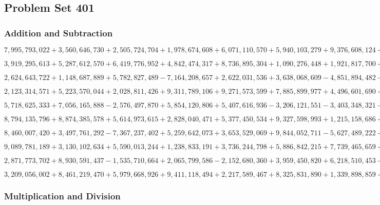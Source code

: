 \hypertarget{problem-set-401}{%
\subsection{Problem Set 401}\label{problem-set-401}}

\hypertarget{addition-and-subtraction}{%
\subsubsection{Addition and
Subtraction}\label{addition-and-subtraction}}

\(7,995,793,022+3,560,646,730+2,505,724,704+1,978,674,608+6,071,110,570+5,940,103,279+9,376,608,124+3,920,818,532+4,724,904,102+1,496,006,232\)

\(3,919,295,613+5,287,612,570+6,419,776,952+4,842,474,317+8,736,895,304+1,090,276,448+1,921,817,700+3,761,078,353+5,026,277,170+3,654,582,004\)

\(2,624,643,722+1,148,687,889+5,782,827,489-7,164,208,657+2,622,031,536+3,638,068,609-4,851,894,482-1,902,033,138+8,033,821,886-7,920,829,272\)

\(2,123,314,571+5,223,570,044+2,028,811,426+9,311,789,106+9,271,573,599+7,885,899,977+4,496,601,690+6,193,841,386+3,490,602,304+9,475,836,045\)

\(5,718,625,333+7,056,165,888-2,576,497,870+5,854,120,806+5,407,616,936-3,206,121,551-3,403,348,321-5,830,244,791+1,591,241,098+8,149,912,383\)

\(8,794,135,796+8,874,385,578+5,614,973,615+2,828,040,471+5,377,450,534+9,327,598,993+1,215,158,686+8,800,128,759+4,950,830,268+6,681,369,923\)

\(8,460,007,420+3,497,761,292-7,367,237,402+5,259,642,073+3,653,529,069+9,844,052,711-5,627,489,222+8,143,346,406-1,672,765,194-2,891,467,431\)

\(9,089,781,189+3,130,102,634+5,590,013,244+1,238,833,191+3,736,244,798+5,886,842,215+7,739,465,659+9,381,265,627+7,292,630,557+7,248,282,232\)

\(2,871,773,702+8,930,591,437-1,535,710,664+2,065,799,586-2,152,680,360+3,959,450,820+6,218,510,453-8,752,101,195+6,987,099,009-1,621,429,459\)

\(3,209,056,002+8,461,219,470+5,979,668,926+9,411,118,494+2,217,589,467+8,325,831,890+1,339,898,859+1,856,818,883+2,215,850,534+2,128,096,993\)

\hypertarget{multiplication-and-division}{%
\subsubsection{Multiplication and
Division}\label{multiplication-and-division}}

